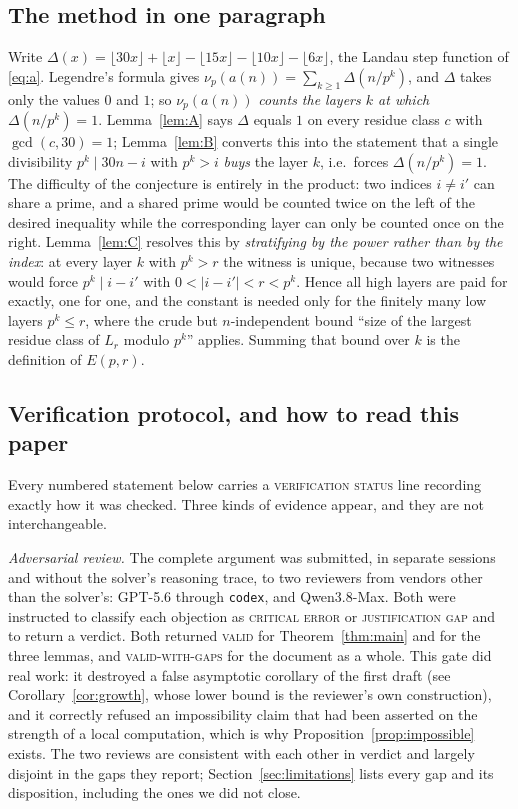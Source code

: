 \documentclass[11pt]{article}
\theoremstyle{plain}
\theoremstyle{definition}
\theoremstyle{remark}
\numberwithin{equation}{section}
\newcommand{\Lr}{L_r}
\begin{document}
\subsection{The method in one paragraph}

Write $\Delta(x) = \lfloor 30x\rfloor + \lfloor x\rfloor - \lfloor 15x\rfloor - \lfloor 10x
\rfloor - \lfloor 6x\rfloor$, the Landau step function of \eqref{eq:a}. Legendre's formula gives
$\nu_p(a(n)) = \sum_{k \ge 1} \Delta(n/p^k)$, and $\Delta$ takes only the values $0$ and $1$;
so $\nu_p(a(n))$ \emph{counts the layers $k$ at which $\Delta(n/p^k) = 1$}. Lemma~\ref{lem:A}
says $\Delta$ equals $1$ on every residue class $c$ with $\gcd(c,30)=1$;
Lemma~\ref{lem:B} converts this into the statement that a single divisibility $p^k \mid 30n - i$
with $p^k > i$ \emph{buys} the layer $k$, i.e.\ forces $\Delta(n/p^k) = 1$. The difficulty of the
conjecture is entirely in the product: two indices $i \ne i'$ can share a prime, and a shared
prime would be counted twice on the left of the desired inequality while the corresponding layer
can only be counted once on the right. Lemma~\ref{lem:C} resolves this by \emph{stratifying by
the power rather than by the index}: at every layer $k$ with $p^k > r$ the witness is unique,
because two witnesses would force $p^k \mid i - i'$ with $0 < |i-i'| < r < p^k$. Hence all high
layers are paid for exactly, one for one, and the constant is needed only for the finitely many
low layers $p^k \le r$, where the crude but $n$-independent bound ``size of the largest residue
class of $\Lr$ modulo $p^k$'' applies. Summing that bound over $k$ is the definition of
$E(p,r)$.

\subsection{Verification protocol, and how to read this paper}

Every numbered statement below carries a \textsc{verification status} line recording exactly how
it was checked. Three kinds of evidence appear, and they are not interchangeable.

\emph{Adversarial review.} The complete argument was submitted, in separate sessions and without
the solver's reasoning trace, to two reviewers from vendors other than the solver's:
GPT-5.6 through \texttt{codex}, and Qwen3.8-Max. Both were instructed to classify each objection
as \textsc{critical error} or \textsc{justification gap} and to return a verdict. Both returned
\textsc{valid} for Theorem~\ref{thm:main} and for the three lemmas, and \textsc{valid-with-gaps}
for the document as a whole. This gate did real work: it destroyed a false asymptotic corollary
of the first draft (see Corollary~\ref{cor:growth}, whose lower bound is the reviewer's own
construction), and it correctly refused an impossibility claim that had been asserted on the
strength of a local computation, which is why Proposition~\ref{prop:impossible} exists. The two
reviews are consistent with each other in verdict and largely disjoint in the gaps they report;
Section~\ref{sec:limitations} lists every gap and its disposition, including the ones we did not
close.
\end{document}
